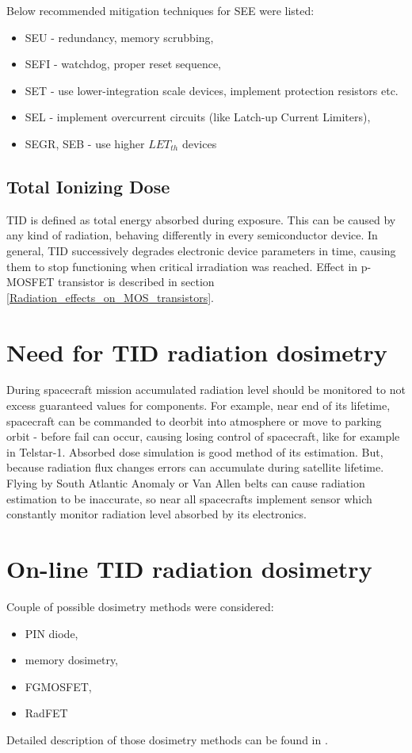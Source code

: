         Below recommended mitigation techniques for SEE were listed:
        \begin{itemize}
            \item SEU - redundancy, memory scrubbing,
            \item SEFI - watchdog, proper reset sequence,
            \item SET - use lower-integration scale devices, implement protection resistors etc.
            \item SEL - implement overcurrent circuits (like Latch-up Current Limiters),
            \item SEGR, SEB - use higher $LET_{th}$ devices
        \end{itemize}

    \subsection{Total Ionizing Dose}
        TID is defined as total energy absorbed during exposure. This can be caused by any kind of radiation, behaving differently in every semiconductor device. In general, TID successively degrades electronic device parameters in time, causing them to stop functioning when critical irradiation was reached. Effect in p-MOSFET transistor is described in section \ref{Radiation_effects_on_MOS_transistors}.

\section{Need for TID radiation dosimetry}
    During spacecraft mission accumulated radiation level should be monitored to not excess guaranteed values for components. For example, near end of its lifetime, spacecraft can be commanded to deorbit into atmosphere or move to parking orbit - before fail can occur, causing losing control of spacecraft, like for example in Telstar-1.
    Absorbed dose simulation is good method of its estimation. But, because radiation flux changes errors can accumulate during satellite lifetime. Flying by South Atlantic Anomaly or Van Allen belts can cause radiation estimation to be inaccurate, so near all spacecrafts implement sensor which constantly monitor radiation level absorbed by its electronics.

\section{On-line TID radiation dosimetry}
    Couple of possible dosimetry methods were considered:
    \begin{itemize}
        \item PIN diode,
        \item memory dosimetry,
        \item FGMOSFET,
        \item RadFET
    \end{itemize}
    Detailed description of those dosimetry methods can be found in \cite{RadFET_PhD}.

